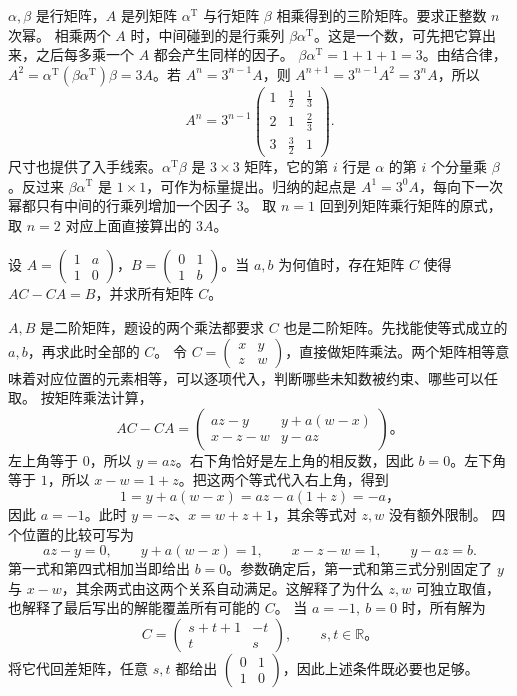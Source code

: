 \documentclass[UTF8,zihao=-4,fontset=fandol]{ctexart}
\begin{document}
\Solution
\Known $\alpha,\beta$ 是行矩阵，$A$ 是列矩阵 $\alpha^{\mathrm T}$ 与行矩阵 $\beta$ 相乘得到的三阶矩阵。要求正整数 $n$ 次幂。
\Method 相乘两个 $A$ 时，中间碰到的是行乘列 $\beta\alpha^{\mathrm T}$。这是一个数，可先把它算出来，之后每多乘一个 $A$ 都会产生同样的因子。
\Derive $\beta\alpha^{\mathrm T}=1+1+1=3$。由结合律，$A^2=\alpha^{\mathrm T}(\beta\alpha^{\mathrm T})\beta=3A$。若 $A^n=3^{n-1}A$，则 $A^{n+1}=3^{n-1}A^2=3^nA$，所以
\[
A^n=3^{n-1}\begin{pmatrix}
1&\frac{1}{2}&\frac{1}{3}\\
2&1&\frac{2}{3}\\
3&\frac{3}{2}&1
\end{pmatrix}.
\]
尺寸也提供了入手线索。$\alpha^{\mathrm T}\beta$ 是 $3\times3$ 矩阵，它的第 $i$ 行是 $\alpha$ 的第 $i$ 个分量乘 $\beta$。反过来 $\beta\alpha^{\mathrm T}$ 是 $1\times1$，可作为标量提出。归纳的起点是 $A^1=3^0A$，每向下一次幂都只有中间的行乘列增加一个因子 $3$。
\Verify 取 $n=1$ 回到列矩阵乘行矩阵的原式，取 $n=2$ 对应上面直接算出的 $3A$。

设 $A=\begin{pmatrix}1&a\\1&0\end{pmatrix}$，$B=\begin{pmatrix}0&1\\1&b\end{pmatrix}$。当 $a,b$ 为何值时，存在矩阵 $C$ 使得 $AC-CA=B$，并求所有矩阵 $C$。

\Solution
\Known $A,B$ 是二阶矩阵，题设的两个乘法都要求 $C$ 也是二阶矩阵。先找能使等式成立的 $a,b$，再求此时全部的 $C$。
\Method 令 $C=\begin{pmatrix}x&y\\z&w\end{pmatrix}$，直接做矩阵乘法。两个矩阵相等意味着对应位置的元素相等，可以逐项代入，判断哪些未知数被约束、哪些可以任取。
\Derive 按矩阵乘法计算，
\[
AC-CA=\begin{pmatrix}
az-y & y+a(w-x)\\
x-z-w & y-az
\end{pmatrix}\text{。}
\]
左上角等于 $0$，所以 $y=az$。右下角恰好是左上角的相反数，因此 $b=0$。左下角等于 $1$，所以 $x-w=1+z$。把这两个等式代入右上角，得到
\[
1=y+a(w-x)=az-a(1+z)=-a\text{，}
\]
因此 $a=-1$。此时 $y=-z$、$x=w+z+1$，其余等式对 $z,w$ 没有额外限制。
四个位置的比较可写为
\[
az-y=0,\qquad y+a(w-x)=1,\qquad x-z-w=1,\qquad y-az=b.
\]
第一式和第四式相加当即给出 $b=0$。参数确定后，第一式和第三式分别固定了 $y$ 与 $x-w$，其余两式由这两个关系自动满足。这解释了为什么 $z,w$ 可独立取值，也解释了最后写出的解能覆盖所有可能的 $C$。
\Verify 当 $a=-1,\ b=0$ 时，所有解为
\[
C=\begin{pmatrix}s+t+1&-t\\t&s\end{pmatrix},\qquad s,t\in\mathbb R\text{。}
\]
将它代回差矩阵，任意 $s,t$ 都给出 $\begin{pmatrix}0&1\\1&0\end{pmatrix}$，因此上述条件既必要也足够。
\end{document}
